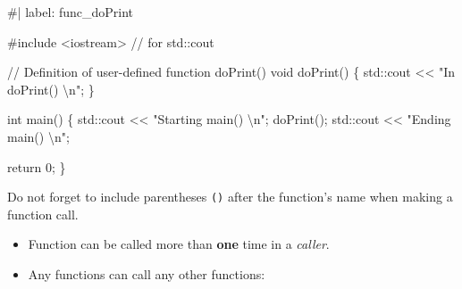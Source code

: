 \documentclass[
  letterpaper,
  DIV=11,
  numbers=noendperiod]{scrreprt}
\newenvironment{Shaded}{\begin{snugshade}}{\end{snugshade}}
\newcommand{\CommentTok}[1]{\textcolor[rgb]{0.37,0.37,0.37}{#1}}
\newcommand{\ControlFlowTok}[1]{\textcolor[rgb]{0.00,0.23,0.31}{#1}}
\newcommand{\DecValTok}[1]{\textcolor[rgb]{0.68,0.00,0.00}{#1}}
\newcommand{\ErrorTok}[1]{\textcolor[rgb]{0.68,0.00,0.00}{#1}}
\newcommand{\FunctionTok}[1]{\textcolor[rgb]{0.28,0.35,0.67}{#1}}
\newcommand{\NormalTok}[1]{\textcolor[rgb]{0.00,0.23,0.31}{#1}}
\newcommand{\SpecialCharTok}[1]{\textcolor[rgb]{0.37,0.37,0.37}{#1}}
\newcommand{\StringTok}[1]{\textcolor[rgb]{0.13,0.47,0.30}{#1}}
\providecommand{\tightlist}{%
  \setlength{\itemsep}{0pt}\setlength{\parskip}{0pt}}\usepackage{longtable,booktabs,array}
\begin{document}
\begin{Shaded}
\begin{Highlighting}[]
\CommentTok{\#| label: func\_doPrint}

\CommentTok{\#include \textless{}iostream\textgreater{}     // for std::cout}

\SpecialCharTok{/}\ErrorTok{/}\NormalTok{ Definition of user}\SpecialCharTok{{-}}\NormalTok{defined }\ControlFlowTok{function} \FunctionTok{doPrint}\NormalTok{()}
\NormalTok{void }\FunctionTok{doPrint}\NormalTok{()}
\NormalTok{\{}
\NormalTok{    std}\SpecialCharTok{::}\NormalTok{cout }\SpecialCharTok{\textless{}}\ErrorTok{\textless{}} \StringTok{"In doPrint() }\SpecialCharTok{\textbackslash{}n}\StringTok{"}\NormalTok{;}
\NormalTok{\}}

\NormalTok{int }\FunctionTok{main}\NormalTok{()}
\NormalTok{\{}
\NormalTok{    std}\SpecialCharTok{::}\NormalTok{cout }\SpecialCharTok{\textless{}}\ErrorTok{\textless{}} \StringTok{"Starting main() }\SpecialCharTok{\textbackslash{}n}\StringTok{"}\NormalTok{;}
    \FunctionTok{doPrint}\NormalTok{();}
\NormalTok{    std}\SpecialCharTok{::}\NormalTok{cout }\SpecialCharTok{\textless{}}\ErrorTok{\textless{}} \StringTok{"Ending main() }\SpecialCharTok{\textbackslash{}n}\StringTok{"}\NormalTok{;}

\NormalTok{    return }\DecValTok{0}\NormalTok{;}
\NormalTok{\}}
\end{Highlighting}
\end{Shaded}

\begin{tcolorbox}[enhanced jigsaw, toprule=.15mm, rightrule=.15mm, opacityback=0, breakable, leftrule=.75mm, colback=white, colframe=quarto-callout-warning-color-frame, arc=.35mm, left=2mm, bottomrule=.15mm]
\begin{minipage}[t]{5.5mm}
\textcolor{quarto-callout-warning-color}{\faExclamationTriangle}
\end{minipage}%
\begin{minipage}[t]{\textwidth - 5.5mm}

Do not forget to include parentheses \texttt{()} after the function's
name when making a function call.

\end{minipage}%
\end{tcolorbox}

\begin{itemize}
\tightlist
\item
  Function can be called more than \textbf{one} time in a \emph{caller}.
\item
  Any functions can call any other functions:
\end{itemize}
\end{document}
